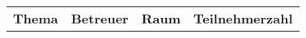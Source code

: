 \begin{minipage}{\textwidth}
\fastnesection{
}

\begin{tabular}{p{6.5cm}|c|c|c}
\textbf{Thema}&\textbf{Betreuer}&\textbf{Raum}&\textbf{Teilnehmerzahl}\\
\end{tabular}
\end{minipage}
\vspace{4ex}
